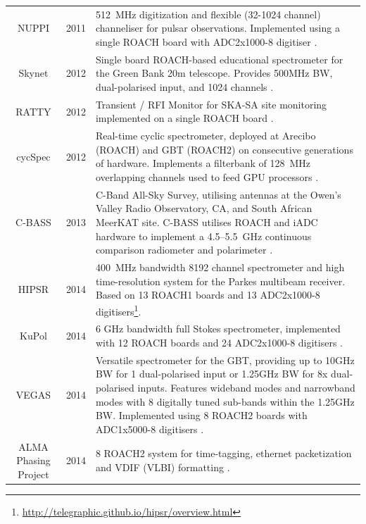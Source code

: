 \documentclass{ws-jai}
\begin{document}
\begin{longtable}{ccp{10cm}}
  NUPPI            & 2011 & 512~MHz digitization and flexible (32-1024 channel) channeliser for pulsar observations. Implemented using a single ROACH board with ADC2x1000-8 digitiser \citep{2014MNRAS.443.3752L}. \\
  Skynet           & 2012 & Single board ROACH-based educational spectrometer for the Green Bank 20m telescope. Provides 500MHz BW, dual-polarised input, and 1024 channels \citep{skynet}. \\
  RATTY            & 2012 & Transient / RFI Monitor for SKA-SA site monitoring implemented on a single ROACH board \citep{Foley01082016, man14}. \\
  cycSpec          & 2012 & Real-time cyclic spectrometer, deployed at Arecibo (ROACH) and GBT (ROACH2) on consecutive generations of hardware. Implements a filterbank of 128~MHz overlapping channels used to feed GPU processors \citep{cycspec}. \\
  C-BASS           & 2013 & C-Band All-Sky Survey, utilising antennas at the Owen's Valley Radio Observatory, CA, and South African MeerKAT site. C-BASS utilises ROACH and iADC hardware to implement a 4.5--5.5~GHz continuous comparison radiometer and polarimeter \citep{chuckles-thesis}.\\
  HIPSR            & 2014 & 400~MHz bandwidth 8192 channel spectrometer and high time-resolution system for the Parkes multibeam receiver. Based on 13 ROACH1 boards and 13 ADC2x1000-8 digitisers\footnote{\url{http://telegraphic.github.io/hipsr/overview.html}}. \\
  KuPol            & 2014 & 6 GHz bandwidth full Stokes spectrometer, implemented with 12 ROACH boards and 24 ADC2x1000-8 digitisers \citep{2013arXiv1303.2131M}. \\
  VEGAS            & 2014 & Versatile spectrometer for the GBT, providing up to 10GHz BW for 1 dual-polarised input or 1.25GHz BW for 8x dual-polarised inputs. Features wideband modes and narrowband modes with 8 digitally tuned sub-bands within the 1.25GHz BW. Implemented using 8 ROACH2 boards with ADC1x5000-8 digitisers \citep{chennamangalam2014gpu}. \\
  ALMA Phasing Project& 2014 & 8 ROACH2 system for time-tagging, ethernet packetization and VDIF (VLBI) formatting \citep{2012evn..confE..53A}. \\

\end{longtable}
\end{document}
